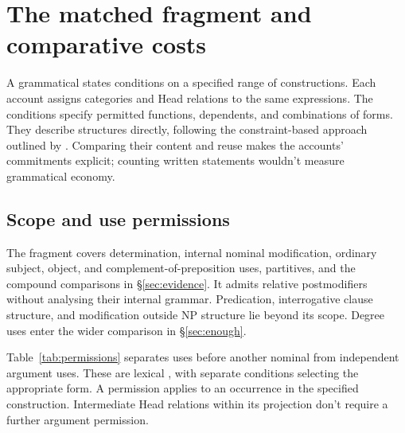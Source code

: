 \section{The matched fragment and comparative costs}\label{sec:economy}

A grammatical  states conditions on a specified range of constructions. Each account assigns categories and Head relations to the same expressions. The conditions specify permitted functions, dependents, and combinations of forms. They describe structures directly, following the constraint-based approach outlined by \textcite{pullum2020theorizing}. Comparing their content and reuse makes the accounts' commitments explicit; counting written statements wouldn't measure grammatical economy.

\subsection{Scope and use permissions}\label{sec:fragment}

The fragment covers determination, internal nominal modification, ordinary subject, object, and complement-of-preposition uses, partitives, and the compound comparisons in §\ref{sec:evidence}. It admits relative postmodifiers without analysing their internal grammar. Predication, interrogative clause structure, and modification outside NP structure lie beyond its scope. Degree uses enter the wider comparison in §\ref{sec:enough}.

Table~\ref{tab:permissions} separates uses before another nominal from independent argument uses. These are lexical , with separate conditions selecting the appropriate form. A permission applies to an occurrence in the specified construction. Intermediate Head relations within its projection don't require a further argument permission.

